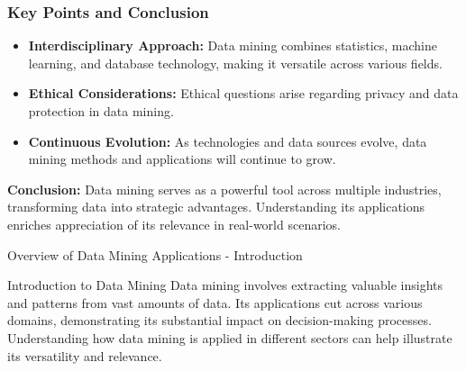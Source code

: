 \documentclass[aspectratio=169]{beamer}
\begin{document}
\begin{frame}[fragile]
    \frametitle{Key Points and Conclusion}
    \begin{itemize}
        \item \textbf{Interdisciplinary Approach:} 
        Data mining combines statistics, machine learning, and database technology, making it versatile across various fields.
        
        \item \textbf{Ethical Considerations:} 
        Ethical questions arise regarding privacy and data protection in data mining.
        
        \item \textbf{Continuous Evolution:} 
        As technologies and data sources evolve, data mining methods and applications will continue to grow.
    \end{itemize}

    \textbf{Conclusion:} Data mining serves as a powerful tool across multiple industries, transforming data into strategic advantages. Understanding its applications enriches appreciation of its relevance in real-world scenarios.
\end{frame}

\begin{frame}[fragile]{Overview of Data Mining Applications - Introduction}
    \begin{block}{Introduction to Data Mining}
        Data mining involves extracting valuable insights and patterns from vast amounts of data. Its applications cut across various domains, demonstrating its substantial impact on decision-making processes. Understanding how data mining is applied in different sectors can help illustrate its versatility and relevance.
    \end{block}
\end{frame}
\end{document}
